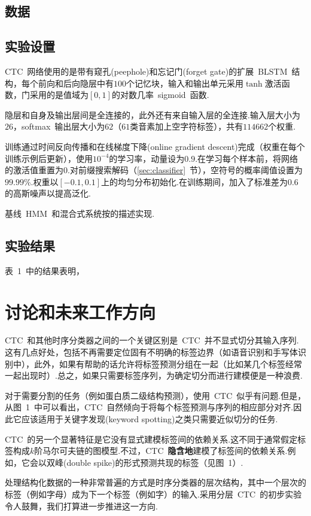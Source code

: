 \documentclass{ctexart}
\begin{document}
\subsection{数据}

\subsection{实验设置}
CTC~网络使用的是带有窥孔(peephole)和忘记门(forget gate)的扩展~BLSTM~结构\citep{gers2003learning}，每个前向和后向隐层中有$100$个记忆块，输入和输出单元采用$\tanh$激活函数，门采用的是值域为$[0,1]$的对数几率~sigmoid~函数.

隐层和自身及输出层间是全连接的，此外还有来自输入层的全连接.输入层大小为$26$，softmax~输出层大小为$62$（$61$类音素加上空字符标签），共有$114662$个权重.

训练通过时间反向传播和在线梯度下降(online gradient descent)完成（权重在每个训练示例后更新），使用$10^{-4}$的学习率，动量设为$0.9$.在学习每个样本前，将网络的激活值重置为$0$.对前缀搜索解码（\ref{sec:classifier}~节），空符号的概率阈值设置为$99.99$\%.权重以$[-0.1,0.1]$上的均匀分布初始化.在训练期间，加入了标准差为$0.6$的高斯噪声以提高泛化.

基线~HMM~和混合式系统按\citep{graves2005bidirectional}的描述实现.
\subsection{实验结果}
表~1~中的结果表明，
\section{讨论和未来工作方向}
\label{sec:discussion}
CTC~和其他时序分类器之间的一个关键区别是~CTC~并不显式切分其输入序列.这有几点好处，包括不再需要定位固有不明确的标签边界（如语音识别和手写体识别中），此外，如果有帮助的话允许将标签预测分组在一起（比如某几个标签经常一起出现时）.总之，如果只需要标签序列，为确定切分而进行建模便是一种浪费.

对于需要分割的任务（例如蛋白质二级结构预测），使用~CTC~似乎有问题.但是，从图~1~中可以看出，CTC~自然倾向于将每个标签预测与序列的相应部分对齐.因此它应该适用于关键字发现(keyword spotting)之类只需要近似切分的任务.

CTC~的另一个显著特征是它没有显式建模标签间的依赖关系.这不同于通常假定标签构成$k$阶马尔可夫链的图模型.不过，CTC~\textbf{隐含地}建模了标签间的依赖关系.例如，它会以双峰(double spike)的形式预测共现的标签（见图~1）.

处理结构化数据的一种非常普遍的方式是时序分类器的层次结构，其中一个层次的标签（例如字母）成为下一个标签（例如字）的输入.采用分层~CTC~的初步实验令人鼓舞，我们打算进一步推进这一方向.
\end{document}

